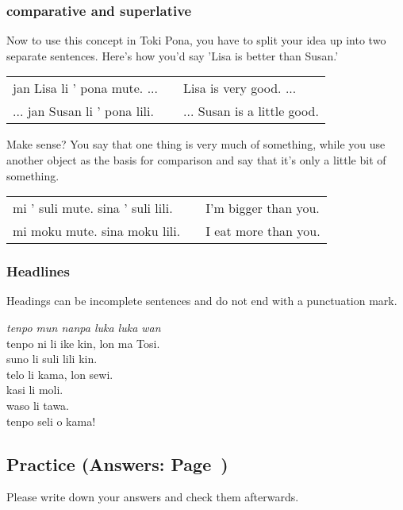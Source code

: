 \subsubsection*{comparative and superlative}
%
%
Now to use this concept in Toki Pona, you have to split your idea up into two separate sentences.
Here's how you'd say 'Lisa is better than Susan.'

\begin{supertabular}{p{5,5cm}|ll}
    jan Lisa li ' pona mute. ...  &  & Lisa is very good. ...      \\ %
    ... jan Susan li ' pona lili. &  & ... Susan is a little good. \\ %
\end{supertabular}

Make sense?
You say that one thing is very much of something, while you use another object as the basis for comparison and say that it's only a little bit of something.

\begin{supertabular}{p{5,5cm}|ll}
    mi ' suli mute. sina ' suli lili. &  & I'm bigger than you. \\
    mi moku mute. sina moku lili.     &  & I eat more than you. \\
\end{supertabular}

%
%
\subsubsection*{Headlines}
%
%
Headings can be incomplete sentences and do not end with a punctuation mark.

\textit{tenpo mun nanpa luka luka wan} \\
tenpo ni li ike kin, lon ma Tosi. \\
suno li suli lili kin. \\
telo li kama, lon sewi. \\
kasi li moli. \\
waso li tawa. \\
tenpo seli o kama!

%
%
%
\newpage
%
\subsection*{Practice (Answers: Page~\pageref{'la'})}
%
Please write down your answers and check them afterwards.

